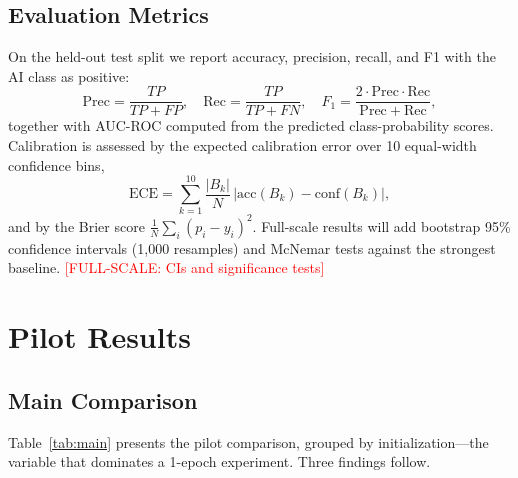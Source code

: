 \documentclass[journal]{IEEEtran}
\newcommand{\fullscale}[1]{\textcolor{red}{[FULL-SCALE: #1]}}
\begin{document}
\subsection{Evaluation Metrics}
On the held-out test split we report accuracy, precision, recall, and F1 with the AI class as positive:
\begin{equation}
\mathrm{Prec} = \frac{TP}{TP+FP}, \quad
\mathrm{Rec} = \frac{TP}{TP+FN}, \quad
F_1 = \frac{2 \cdot \mathrm{Prec} \cdot \mathrm{Rec}}{\mathrm{Prec} + \mathrm{Rec}},
\end{equation}
together with AUC-ROC computed from the predicted class-probability scores. Calibration is assessed by the expected calibration error over 10 equal-width confidence bins,
\begin{equation}
\mathrm{ECE} = \sum_{k=1}^{10} \frac{|B_k|}{N}\, \big| \mathrm{acc}(B_k) - \mathrm{conf}(B_k) \big|,
\end{equation}
and by the Brier score $\frac{1}{N}\sum_i (p_i - y_i)^2$. Full-scale results will add bootstrap 95\% confidence intervals (1{,}000 resamples) and McNemar tests against the strongest baseline. \fullscale{CIs and significance tests}

\section{Pilot Results}

\subsection{Main Comparison}
\label{sec:main}
Table~\ref{tab:main} presents the pilot comparison, grouped by initialization---the variable that dominates a 1-epoch experiment. Three findings follow.
\end{document}
